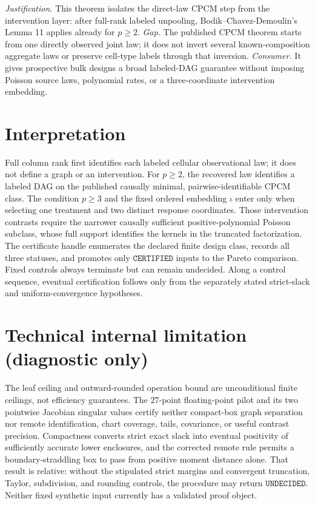\documentclass{article}
\begin{document}
\par\smallskip\noindent \textit{Justification.} This theorem isolates the direct-law CPCM step from the intervention layer: after full-rank labeled unpooling, Bodik--Chavez-Demoulin's Lemma 11 applies already for \(p\geq2\). \textit{Gap.} The published CPCM theorem starts from one directly observed joint law; it does not invert several known-composition aggregate laws or preserve cell-type labels through that inversion. \textit{Consumer.} It gives prospective bulk designs a broad labeled-DAG guarantee without imposing Poisson source laws, polynomial rates, or a three-coordinate intervention embedding.

\section{Interpretation}

Full column rank first identifies each labeled cellular observational law; it does not define a graph or an intervention. For \(p\geq2\), the recovered law identifies a labeled DAG on the published causally minimal, pairwise-identifiable CPCM class. The condition \(p\geq3\) and the fixed ordered embedding \(\iota\) enter only when selecting one treatment and two distinct response coordinates. Those intervention contrasts require the narrower causally sufficient positive-polynomial Poisson subclass, whose full support identifies the kernels in the truncated factorization. The certificate handle enumerates the declared finite design class, records all three statuses, and promotes only \(\mathtt{CERTIFIED}\) inputs to the Pareto comparison. Fixed controls always terminate but can remain undecided. Along a control sequence, eventual certification follows only from the separately stated strict-slack and uniform-convergence hypotheses.

\section*{Technical internal limitation (diagnostic only)}

The leaf ceiling and outward-rounded operation bound are unconditional finite ceilings, not efficiency guarantees. The \(27\)-point floating-point pilot and its two pointwise Jacobian singular values certify neither compact-box graph separation nor remote identification, chart coverage, tails, covariance, or useful contrast precision. Compactness converts strict exact slack into eventual positivity of sufficiently accurate lower enclosures, and the corrected remote rule permits a boundary-straddling box to pass from positive moment distance alone. That result is relative: without the stipulated strict margins and convergent truncation, Taylor, subdivision, and rounding controls, the procedure may return \(\mathtt{UNDECIDED}\). Neither fixed synthetic input currently has a validated proof object.
\end{document}
